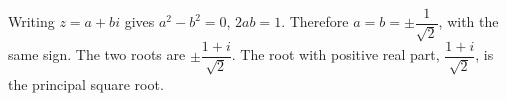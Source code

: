 Writing $ z=a+bi $ gives $ a^2-b^2=0 $, $ 2ab=1 $. Therefore $ a=b=\pm\dfrac{1}{\sqrt2}$, with the same sign. The two roots are $\boxed{\pm\dfrac{1+i}{\sqrt2}}$. The root with positive real part, $\dfrac{1+i}{\sqrt2}$, is the principal square root.
